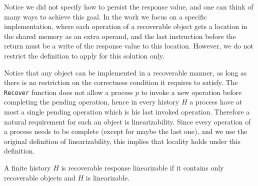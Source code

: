 Notice we did not specify how to persist the response value, and one can think of many ways to achieve this goal. In the work we focus on a specific implementation, where each operation of a recoverable object gets a location in the shared memory as an extra operand, and the last instruction before the return must be a write of the response value to this location. However, we do not restrict the definition to apply for this solution only.

Notice that any object can be implemented in a recoverable manner, as long as there is no restriction on the correctness condition it requires to satisfy. The \texttt{Recover} function does not allow a process $p$ to invoke a new operation before completing the pending operation, hence in every history $H$ a process have at most a single pending operation which is his last invoked operation. Therefore a natural requirement for such an object is linearizability. Since every operation of a process needs to be complete (except for maybe the last one), and we use the original definition of linearizability, this implies that locality holds under this definition.

\begin{definition} 
	\label{Definition: RR-linearizability}
	A finite history $H$ is recoverable response linearizable if it contains only recoverable objects and $H$ is linearizable.
\end{definition}

